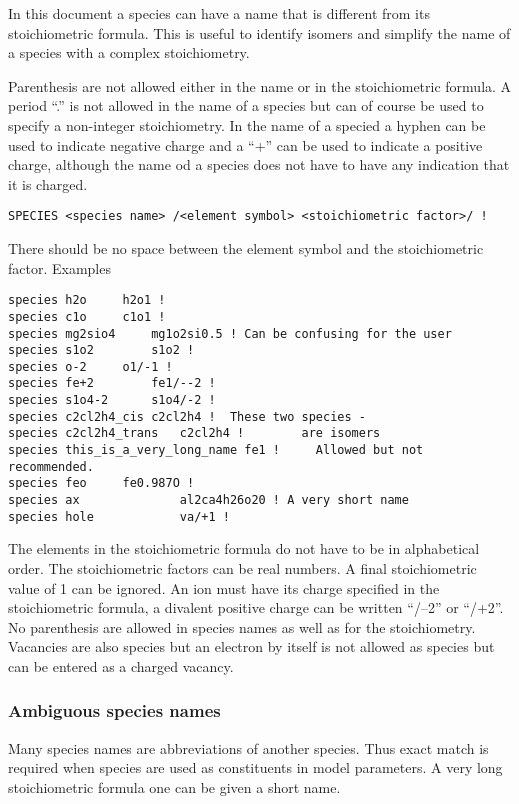 \documentclass[12pt]{article}
\begin{document}
In this document a species can have a name that is different from its
stoichiometric formula.  This is useful to identify isomers and
simplify the name of a species with a complex stoichiometry.

Parenthesis are not allowed either in the name or in the
stoichiometric formula.  A period ``.'' is not allowed in the name of
a species but can of course be used to specify a non-integer
stoichiometry.  In the name of a specied a hyphen can be used to
indicate negative charge and a ``+'' can be used to indicate a
positive charge, although the name od a species does not have to have
any indication that it is charged.

\begin{verbatim}
SPECIES <species name> /<element symbol> <stoichiometric factor>/ !
\end{verbatim}

There should be no space between the element symbol and the
stoichiometric factor.  Examples

\begin{verbatim}
species h2o		h2o1 !
species c1o		c1o1 !
species mg2sio4		mg1o2si0.5 ! Can be confusing for the user
species s1o2		s1o2 !
species o-2		o1/-1 !
species fe+2		fe1/--2 !
species s1o4-2		s1o4/-2 !
species c2cl2h4_cis	c2cl2h4 !  These two species -
species c2cl2h4_trans	c2cl2h4 !        are isomers
species this_is_a_very_long_name fe1 !     Allowed but not recommended.
species feo		fe0.987O !
species ax              al2ca4h26o20 ! A very short name
species hole            va/+1 !
\end{verbatim}

The elements in the stoichiometric formula do not have to be in
alphabetical order.  The stoichiometric factors can be real numbers.
A final stoichiometric value of 1 can be ignored.  An ion must have
its charge specified in the stoichiometric formula, a divalent
positive charge can be written ``/--2'' or ``/+2''.  No parenthesis
are allowed in species names as well as for the stoichiometry.
Vacancies are also species but an electron by itself is not allowed as
species but can be entered as a charged vacancy.

\subsubsection{Ambiguous species names}\label{sec:spnames}

Many species names are abbreviations of another species.  Thus exact
match is required when species are used as constituents in model
parameters.  A very long stoichiometric formula one can be given a
short name.
\end{document}
